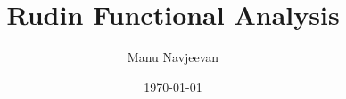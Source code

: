 \documentclass[10pt]{article}
\title{Rudin Functional Analysis}
\author{Manu Navjeevan}
\date{\today}
\theoremstyle{exampstyle}
\begin{document}
\maketitle
\tableofcontents
\newpage

\normalsize


\end{document}
